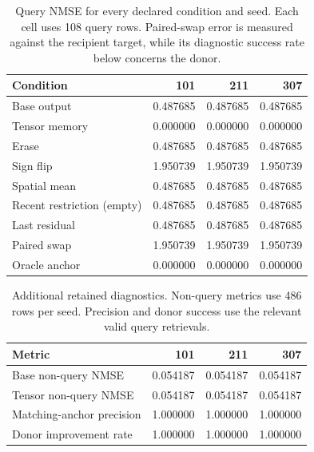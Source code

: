 \begin{table}[ht]\centering\small
\caption{Query NMSE for every declared condition and seed. Each cell uses 108 query rows. Paired-swap error is measured against the recipient target, while its diagnostic success rate below concerns the donor.}
\label{tab:results}\begin{tabular}{lrrr}\toprule
Condition & 101 & 211 & 307 \\\midrule
Base output & 0.487685 & 0.487685 & 0.487685 \\
Tensor memory & 0.000000 & 0.000000 & 0.000000 \\
Erase & 0.487685 & 0.487685 & 0.487685 \\
Sign flip & 1.950739 & 1.950739 & 1.950739 \\
Spatial mean & 0.487685 & 0.487685 & 0.487685 \\
Recent restriction (empty) & 0.487685 & 0.487685 & 0.487685 \\
Last residual & 0.487685 & 0.487685 & 0.487685 \\
Paired swap & 1.950739 & 1.950739 & 1.950739 \\
Oracle anchor & 0.000000 & 0.000000 & 0.000000 \\
\bottomrule\end{tabular}\end{table}
\begin{table}[ht]\centering\small
\caption{Additional retained diagnostics. Non-query metrics use 486 rows per seed. Precision and donor success use the relevant valid query retrievals.}
\begin{tabular}{lrrr}\toprule
Metric & 101 & 211 & 307 \\\midrule
Base non-query NMSE & 0.054187 & 0.054187 & 0.054187 \\
Tensor non-query NMSE & 0.054187 & 0.054187 & 0.054187 \\
Matching-anchor precision & 1.000000 & 1.000000 & 1.000000 \\
Donor improvement rate & 1.000000 & 1.000000 & 1.000000 \\
\bottomrule\end{tabular}\end{table}
